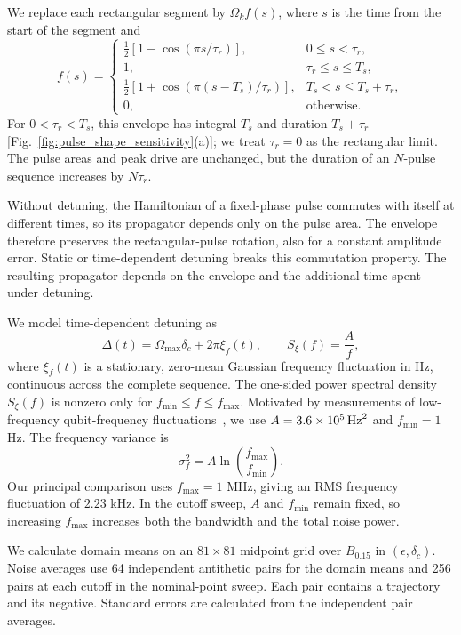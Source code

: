 \documentclass[10pt,aps,twocolumn,pra,floatfix,superscriptaddress]{revtex4-2}
\begin{document}
We replace each rectangular segment by $\Omega_k f(s)$, where $s$
is the time from the start of the segment and
\begin{equation}
f(s)=
\begin{cases}
\tfrac12[1-\cos(\pi s/\tau_r)],&0\leq s<\tau_r,\\
1,&\tau_r\leq s\leq T_s,\\
\tfrac12[1+\cos(\pi(s-T_s)/\tau_r)],&
T_s<s\leq T_s+\tau_r,\\
0,&\text{otherwise}.
\end{cases}
\label{eq:flat_top}
\end{equation}
For $0<\tau_r<T_s$, this envelope has integral $T_s$ and duration
$T_s+\tau_r$ [Fig.~\ref{fig:pulse_shape_sensitivity}(a)]; we treat
$\tau_r=0$ as the rectangular limit. The pulse areas and peak drive
are unchanged, but the duration of an $N$-pulse sequence increases
by $N\tau_r$.

Without detuning, the Hamiltonian of a fixed-phase pulse commutes with
itself at different times, so its propagator depends only on the pulse
area. The envelope therefore preserves the rectangular-pulse rotation,
also for a constant amplitude error. Static or time-dependent detuning
breaks this commutation property. The resulting propagator depends on
the envelope and the additional time spent under detuning.

We model time-dependent detuning as
\begin{equation}
\Delta(t)=\Omega_{\max}\delta_c+2\pi\xi_f(t),
\qquad S_{\xi}(f)=\frac{A}{f},
\label{eq:detuning_noise}
\end{equation}
where $\xi_f(t)$ is a stationary, zero-mean Gaussian frequency
fluctuation in Hz, continuous across the complete sequence. The
one-sided power spectral density $S_{\xi}(f)$ is nonzero only for
$f_{\min}\leq f\leq f_{\max}$. Motivated by measurements of
low-frequency qubit-frequency fluctuations~\cite{Yan_2012_noise,Burnett_2019_frequency},
we use $A=3.6\times10^5\,{\rm Hz}^2$ and $f_{\min}=1$ Hz. The
frequency variance is
\begin{equation}
\sigma_f^2=A\ln\!\left(\frac{f_{\max}}{f_{\min}}\right).
\end{equation}
Our principal comparison uses $f_{\max}=1$ MHz, giving an RMS frequency
fluctuation of $2.23$ kHz. In the cutoff sweep, $A$ and $f_{\min}$
remain fixed, so increasing $f_{\max}$ increases both the bandwidth
and the total noise power.

We calculate domain means on an $81\times81$ midpoint grid over
$B_{0.15}$ in $(\epsilon,\delta_c)$. Noise averages use 64 independent
antithetic pairs for the domain means and 256 pairs at each cutoff
in the nominal-point sweep. Each pair contains a trajectory and its
negative. Standard errors are calculated from
the independent pair averages.
\end{document}
